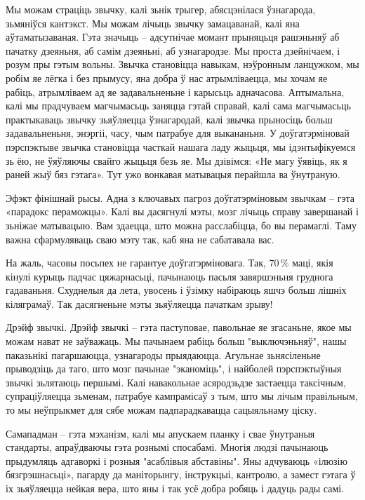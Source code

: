 Мы можам страціць звычку, калі зьнік трыгер, абясцэнілася ўзнагарода, зьмяніўся кантэкст. Мы можам лічыць звычку замацаванай, калі яна аўтаматызаваная. Гэта значыць – адсутнічае момант прыняцьця рашэньняў аб пачатку дзеяньня, аб самім дзеяньні, аб узнагародзе. Мы проста дзейнічаем, і розум пры гэтым вольны. Звычка становіцца навыкам, нэўронным ланцужком, мы робім яе лёгка і без прымусу, яна добра ў нас атрымліваецца, мы хочам яе рабіць, атрымліваем ад яе задавальненьне і карысьць адначасова. Аптымальна, калі мы прадчуваем магчымасьць заняцца гэтай справай, калі сама магчымасьць практыкаваць звычку зьяўляецца ўзнагародай, калі звычка прыносіць больш задавальненьня, энэргіі, часу, чым патрабуе для выкананьня. У доўгатэрміновай пэрспэктыве звычка становіцца часткай нашага ладу жыцьця, мы ідэнтыфікуемся зь ёю, не ўяўляючы свайго жыцьця безь яе. Мы дзівімся: «Не магу ўявіць, як я раней жыў бяз гэтага». Тут ужо вонкавая матывацыя перайшла ва ўнутраную.

Эфэкт фінішнай рысы. Адна з ключавых пагроз доўгатэрміновым звычкам – гэта «парадокс пераможцы». Калі вы дасягнулі мэты, мозг лічыць справу завершанай і зьніжае матывацыю. Вам здаецца, што можна расслабіцца, бо вы перамаглі. Таму важна сфармуляваць сваю мэту так, каб яна не сабатавала вас.

На жаль, часовы посьпех не гарантуе доўгатэрміновага. Так, 70\,\% маці, якія кінулі курыць падчас цяжарнасьці, пачынаюць пасьля завяршэньня груднога гадаваньня. Схуднелыя да лета, увосень і ўзімку набіраюць яшчэ больш лішніх кіляграмаў. Так дасягненьне мэты зьяўляецца пачаткам зрыву!

Дрэйф звычкі. Дрэйф звычкі – гэта паступовае, павольнае яе згасаньне, якое мы можам нават не заўважаць. Мы пачынаем рабіць больш "выключэньняў", нашы паказьнікі пагаршаюцца, узнагароды прыядаюцца. Агульнае зьнясіленьне прыводзіць да таго, што мозг пачынае "эканоміць", і найболей пэрспэктыўныя звычкі зьлятаюць першымі. Калі навакольнае асяродзьдзе застаецца таксічным, супраціўляецца зьменам, патрабуе кампрамісаў з тым, што мы лічым правільным, то мы неўпрыкмет для сябе можам падпарадкавацца сацыяльнаму ціску.

Самападман – гэта мэханізм, калі мы апускаем планку і свае ўнутраныя стандарты, апраўдваючы гэта рознымі спосабамі. Многія людзі пачынаюць прыдумляць адгаворкі і розныя "асаблівыя абставіны". Яны адчуваюць «ілюзію бязгрэшнасьці», пагарду да маніторынгу, інструкцыі, кантролю, а замест гэтага ў іх зьяўляецца нейкая вера, што яны і так усё добра робяць і дадуць рады самі.

